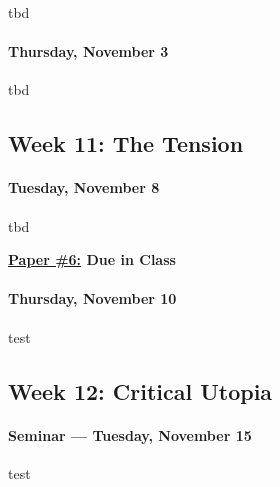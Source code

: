       \begin{itemize*}
      \item tbd
      \end{itemize*}
    
      
\paragraph{Thursday, November 3}
      
      \begin{itemize*}
      \item tbd
    \end{itemize*}
    
    
    \subsection{\textbf{Week 11}: The Tension}
    
\paragraph{Tuesday, November 8}
    
    \begin{itemize*}
    \item tbd
    \end{itemize*}

\textbf{\underline{Paper \#6:} Due in Class}

\paragraph{Thursday, November 10}
    
    \begin{itemize*}
    \item test	
    \end{itemize*}	
    
    \subsection{\textbf{Week 12}: Critical Utopia}
    
    \paragraph{Seminar --- Tuesday, November 15}
    
    \begin{itemize*}
    \item test
    \end{itemize*}
    
